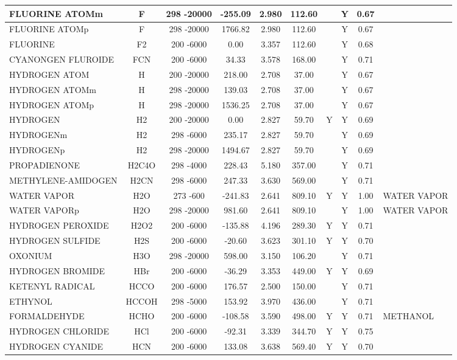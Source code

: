\begin{longtable}{@{\extracolsep{\fill}}|l|c|c|c|c|c|c|c|c|l|}
FLUORINE ATOMm&F&298 -20000& -255.09& 2.980&   112.60& &Y& 0.67&\\ \hline
FLUORINE ATOMp&F&298 -20000& 1766.82& 2.980&   112.60& &Y& 0.67&\\ \hline
FLUORINE&F2&200 -6000&    0.00& 3.357&   112.60& &Y& 0.68&\\ \hline
CYANONGEN FLUROIDE&FCN&200 -6000&   34.33& 3.578&   168.00& &Y& 0.71&\\ \hline
HYDROGEN ATOM&H&200 -20000&  218.00& 2.708&    37.00& &Y& 0.67&\\ \hline
HYDROGEN ATOMm&H&298 -20000&  139.03& 2.708&    37.00& &Y& 0.67&\\ \hline
HYDROGEN ATOMp&H&298 -20000& 1536.25& 2.708&    37.00& &Y& 0.67&\\ \hline
HYDROGEN&H2&200 -20000&    0.00& 2.827&    59.70&Y&Y& 0.69&\\ \hline
HYDROGENm&H2&298 -6000&  235.17& 2.827&    59.70& &Y& 0.69&\\ \hline
HYDROGENp&H2&298 -20000& 1494.67& 2.827&    59.70& &Y& 0.69&\\ \hline
PROPADIENONE&H2C4O&298 -4000&  228.43& 5.180&   357.00& &Y& 0.71&\\ \hline
METHYLENE-AMIDOGEN&H2CN&298 -6000&  247.33& 3.630&   569.00& &Y& 0.71&\\ \hline
WATER VAPOR&H2O&273 -600& -241.83& 2.641&   809.10&Y&Y& 1.00&WATER VAPOR\\ \hline
WATER VAPORp&H2O&298 -20000&  981.60& 2.641&   809.10& &Y& 1.00&WATER VAPOR\\ \hline
HYDROGEN PEROXIDE&H2O2&200 -6000& -135.88& 4.196&   289.30&Y&Y& 0.71&\\ \hline
HYDROGEN SULFIDE&H2S&200 -6000&  -20.60& 3.623&   301.10&Y&Y& 0.70&\\ \hline
OXONIUM&H3O&298 -20000&  598.00& 3.150&   106.20& &Y& 0.71&\\ \hline
HYDROGEN BROMIDE&HBr&200 -6000&  -36.29& 3.353&   449.00&Y&Y& 0.69&\\ \hline
KETENYL RADICAL&HCCO&200 -6000&  176.57& 2.500&   150.00& &Y& 0.71&\\ \hline
ETHYNOL&HCCOH&298 -5000&  153.92& 3.970&   436.00& &Y& 0.71&\\ \hline
FORMALDEHYDE&HCHO&200 -6000& -108.58& 3.590&   498.00&Y&Y& 0.71&METHANOL\\ \hline
HYDROGEN CHLORIDE&HCl&200 -6000&  -92.31& 3.339&   344.70&Y&Y& 0.75&\\ \hline
HYDROGEN CYANIDE&HCN&200 -6000&  133.08& 3.638&   569.40&Y&Y& 0.70&\\ \hline

\end{longtable}
